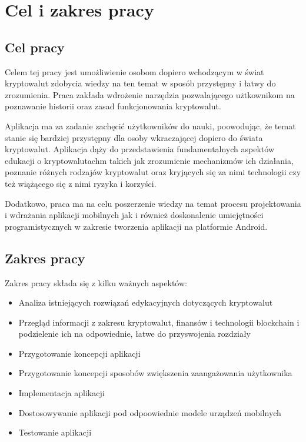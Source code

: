 \clearpage
\chapter{Cel i zakres pracy}
\section{Cel pracy}
Celem tej pracy jest umożliwienie osobom dopiero wchodzącym w świat kryptowalut zdobycia wiedzy na ten temat w sposób przystępny i łatwy do zrozumienia. Praca zakłada wdrożenie narzędzia pozwalającego użtkownikom na poznawanie historii oraz zasad funkcjonowania kryptowalut.

Aplikacja ma za zadanie zachęcić użytkowników do nauki, poowodując, że temat stanie się bardziej przystępny dla osoby wkraczającej dopiero do świata kryptowalut. Aplikacja dąży do przedstawienia fundamentalnych aspektów edukacji o kryptowalutachm takich jak zrozumienie mechanizmów ich działania, poznanie różnych rodzajów kryptowalut oraz kryjących się za nimi technologii czy też wiążącego się z nimi ryzyka i korzyści. 

Dodatkowo, praca ma na celu poszerzenie wiedzy na temat procesu projektowania i wdrażania aplikacji mobilnych jak i również doskonalenie umiejętności programistycznych w zakresie tworzenia aplikacji na platformie Android.

\section{Zakres pracy}
 Zakres pracy składa się z kilku ważnych aspektów:
\begin{itemize}
    \item Analiza istniejących rozwiązań edykacyjnych dotyczących kryptowalut
    \item Przegląd informacji z zakresu kryptowalut, finansów i technologii blockchain i podzielenie ich na odpowiednie, łatwe do przyswojenia rozdziały
    \item Przygotowanie koncepcji aplikacji
    \item Przygotowanie koncepcji sposobów zwiększenia zaangażowania użytkownika
    \item Implementacja aplikacji
    \item Dostosowywanie aplikacji pod odpoowiednie modele urządzeń mobilnych
    \item Testowanie aplikacji 
    \end{itemize}